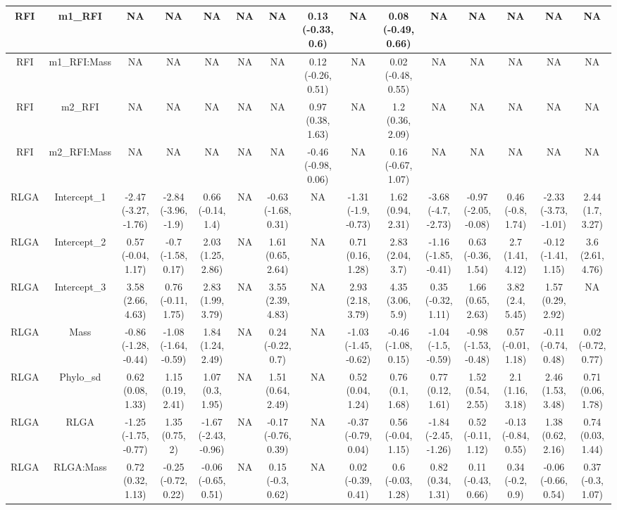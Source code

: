\begin{longtable}[t]{c|c|c|c|c|c|c|c|c|c|c|c|c|c|c}
\hline
RFI & m1_RFI & NA & NA & NA & NA & NA & 0.13 (-0.33, 0.6) & NA & 0.08 (-0.49, 0.66) & NA & NA & NA & NA & NA\\
\hline
RFI & m1_RFI:Mass & NA & NA & NA & NA & NA & 0.12 (-0.26, 0.51) & NA & 0.02 (-0.48, 0.55) & NA & NA & NA & NA & NA\\
\hline
RFI & m2_RFI & NA & NA & NA & NA & NA & 0.97 (0.38, 1.63) & NA & 1.2 (0.36, 2.09) & NA & NA & NA & NA & NA\\
\hline
RFI & m2_RFI:Mass & NA & NA & NA & NA & NA & -0.46 (-0.98, 0.06) & NA & 0.16 (-0.67, 1.07) & NA & NA & NA & NA & NA\\
\hline
RLGA & Intercept_1 & -2.47 (-3.27, -1.76) & -2.84 (-3.96, -1.9) & 0.66 (-0.14, 1.4) & NA & -0.63 (-1.68, 0.31) & NA & -1.31 (-1.9, -0.73) & 1.62 (0.94, 2.31) & -3.68 (-4.7, -2.73) & -0.97 (-2.05, -0.08) & 0.46 (-0.8, 1.74) & -2.33 (-3.73, -1.01) & 2.44 (1.7, 3.27)\\
\hline
RLGA & Intercept_2 & 0.57 (-0.04, 1.17) & -0.7 (-1.58, 0.17) & 2.03 (1.25, 2.86) & NA & 1.61 (0.65, 2.64) & NA & 0.71 (0.16, 1.28) & 2.83 (2.04, 3.7) & -1.16 (-1.85, -0.41) & 0.63 (-0.36, 1.54) & 2.7 (1.41, 4.12) & -0.12 (-1.41, 1.15) & 3.6 (2.61, 4.76)\\
\hline
RLGA & Intercept_3 & 3.58 (2.66, 4.63) & 0.76 (-0.11, 1.75) & 2.83 (1.99, 3.79) & NA & 3.55 (2.39, 4.83) & NA & 2.93 (2.18, 3.79) & 4.35 (3.06, 5.9) & 0.35 (-0.32, 1.11) & 1.66 (0.65, 2.63) & 3.82 (2.4, 5.45) & 1.57 (0.29, 2.92) & NA\\
\hline
RLGA & Mass & -0.86 (-1.28, -0.44) & -1.08 (-1.64, -0.59) & 1.84 (1.24, 2.49) & NA & 0.24 (-0.22, 0.7) & NA & -1.03 (-1.45, -0.62) & -0.46 (-1.08, 0.15) & -1.04 (-1.5, -0.59) & -0.98 (-1.53, -0.48) & 0.57 (-0.01, 1.18) & -0.11 (-0.74, 0.48) & 0.02 (-0.72, 0.77)\\
\hline
RLGA & Phylo_sd & 0.62 (0.08, 1.33) & 1.15 (0.19, 2.41) & 1.07 (0.3, 1.95) & NA & 1.51 (0.64, 2.49) & NA & 0.52 (0.04, 1.24) & 0.76 (0.1, 1.68) & 0.77 (0.12, 1.61) & 1.52 (0.54, 2.55) & 2.1 (1.16, 3.18) & 2.46 (1.53, 3.48) & 0.71 (0.06, 1.78)\\
\hline
RLGA & RLGA & -1.25 (-1.75, -0.77) & 1.35 (0.75, 2) & -1.67 (-2.43, -0.96) & NA & -0.17 (-0.76, 0.39) & NA & -0.37 (-0.79, 0.04) & 0.56 (-0.04, 1.15) & -1.84 (-2.45, -1.26) & 0.52 (-0.11, 1.12) & -0.13 (-0.84, 0.55) & 1.38 (0.62, 2.16) & 0.74 (0.03, 1.44)\\
\hline
RLGA & RLGA:Mass & 0.72 (0.32, 1.13) & -0.25 (-0.72, 0.22) & -0.06 (-0.65, 0.51) & NA & 0.15 (-0.3, 0.62) & NA & 0.02 (-0.39, 0.41) & 0.6 (-0.03, 1.28) & 0.82 (0.34, 1.31) & 0.11 (-0.43, 0.66) & 0.34 (-0.2, 0.9) & -0.06 (-0.66, 0.54) & 0.37 (-0.3, 1.07)\\
\hline
\end{longtable}
\endgroup{}
